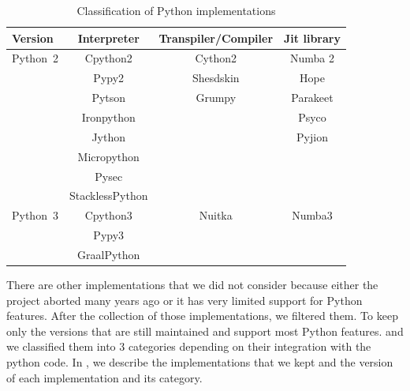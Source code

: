 \begin{table}[hbt]
    \caption{Classification of Python implementations}
    \label{fig:pythonimplementations}
    \center
    \begin{tabular}{|l|c|c|c|}
        \hline
        Version  & Interpreter     & Transpiler/Compiler & Jit library \\
        \hline
        \hline
        Python~2 & Cpython2        & Cython2             & Numba 2     \\
                 & Pypy2           & Shesdskin           & Hope        \\
                 & Pytson          & Grumpy              & Parakeet    \\
                 & Ironpython      &                     & Psyco       \\
                 & Jython          &                     & Pyjion      \\
                 & Micropython     &                     &             \\
                 & Pysec           &                     &             \\
                 & StacklessPython &                     &             \\
        \hline
        Python~3 & Cpython3        & Nuitka              & Numba3      \\
                 & Pypy3           &                     &             \\
                 & GraalPython     &                     &             \\
        \hline
    \end{tabular}
\end{table}

There are other implementations that we did not consider because either the project aborted many years ago or it has very limited support for Python features.
After the collection of those implementations, we filtered them. To keep only the versions that are still maintained and support most Python features.
and we classified them into 3 categories depending on their integration with the python code.
In , we describe the implementations that we kept and the version of each implementation and its category.

